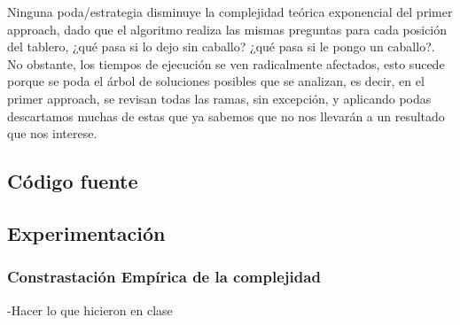Ninguna poda/estrategia disminuye la complejidad te\'orica exponencial del primer approach, dado que el algoritmo realiza las mismas preguntas para cada posici\'on del tablero, ¿qu\'e pasa si lo dejo sin caballo? ¿qu\'e pasa si le pongo un caballo?. No obstante, los tiempos de ejecuci\'on se ven radicalmente afectados, esto sucede porque se poda el \'arbol de soluciones posibles que se analizan, es decir, en el primer approach, se revisan todas las ramas, sin excepci\'on, y aplicando podas descartamos muchas de estas que ya sabemos que no nos llevar\'an a un resultado que nos interese.\\
\newpage

\subsection{C\'odigo fuente}
\newpage
\subsection{Experimentaci\'on}

\subsubsection{Constrastaci\'on Emp\'irica de la complejidad}
-Hacer lo que hicieron en clase\\
\newpage
